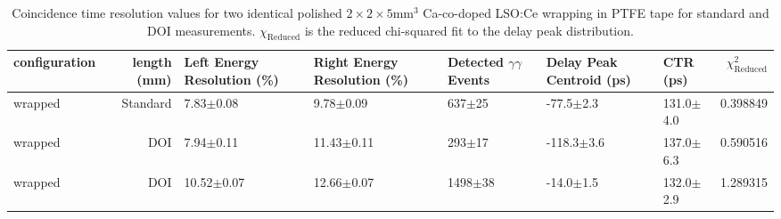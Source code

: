 \begin{table}
\caption{\label{tab:referencevals} Coincidence time resolution values for two identical polished $2\times2\times5$mm$^3$ Ca-co-doped LSO:Ce wrapping in PTFE tape for standard and DOI measurements. $\chi_\text{Reduced}$ is the reduced chi-squared fit to the delay peak distribution.}
\begin{tabular}{lrlllllr}
configuration &  length (mm) & Left Energy Resolution (\%) & Right Energy Resolution (\%) & Detected $\gamma\gamma$ Events & Delay Peak Centroid (ps) & CTR (ps) &  $\chi^2_\text{Reduced}$ \\
\hline
      wrapped &  Standard &        7.83$\pm$0.08 &    9.78$\pm$0.09 &   637$\pm$25 &   -77.5$\pm$2.3 &  131.0$\pm$4.0 &    0.398849 \\
      wrapped &       DOI &        7.94$\pm$0.11 &   11.43$\pm$0.11 &   293$\pm$17 &  -118.3$\pm$3.6 &  137.0$\pm$6.3 &    0.590516 \\
      wrapped &       DOI &       10.52$\pm$0.07 &   12.66$\pm$0.07 &  1498$\pm$38 &   -14.0$\pm$1.5 &  132.0$\pm$2.9 &    1.289315 \\
\hline
\end{tabular}
\end{table}